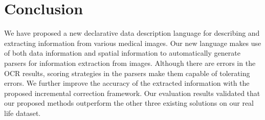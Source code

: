 \section{Conclusion}
\label{sec:conclude}
We have proposed a new declarative 
data description language for describing and extracting 
information from various medical images. 
Our new language makes use of both data information and 
spatial information to automatically 
generate parsers for information extraction from 
images. Although there are errors in the OCR results, 
scoring strategies in the parsers make them capable of 
tolerating errors. 
We further improve the accuracy of the 
extracted information with the proposed incremental correction framework. 
Our evaluation results validated 
that our proposed methods outperform the other three 
existing solutions on our real life dataset. 


